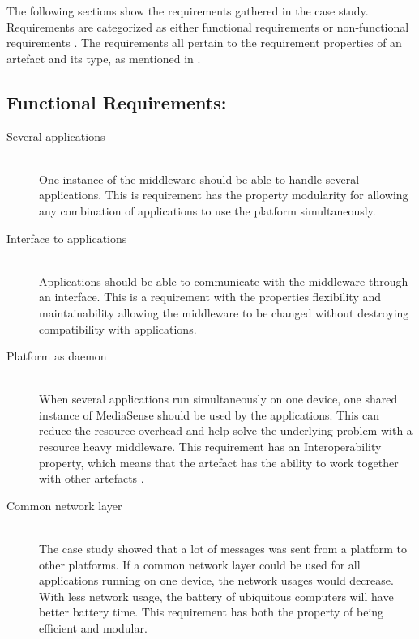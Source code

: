
The following sections show the requirements gathered in the case study. Requirements are categorized as either functional requirements or non-functional requirements \cite{Roman1985}. The requirements all pertain to the requirement properties of an artefact and its type, as mentioned in \cite{johannesson2012design}. 

\subsection{Functional Requirements:}
\begin{description}
	\item[Several applications] \hfill \\
	One instance of the middleware should be able to handle several applications.
	This is requirement has the property modularity for allowing any combination of applications to use the platform simultaneously.
		
	
	\item[Interface to applications] \hfill \\
	Applications should be able to communicate with the middleware through an interface.
	This is a requirement with the properties flexibility and maintainability allowing the middleware to be changed without destroying compatibility with applications.
	
	\item[Platform as daemon] \hfill \\
	When several applications run simultaneously on one device, one shared instance of MediaSense should be used by the applications. This can reduce the resource overhead and help solve the underlying problem with a resource heavy middleware. This requirement has an Interoperability property, which means that the artefact has the ability to work together with other artefacts \cite{johannesson2012design}. 
	
	\item[Common network layer] \hfill \\
	The case study showed that a lot of messages was sent from a platform to other platforms. If a common network layer could be used for all applications running on one device, the network usages would decrease. With less network usage, the battery of ubiquitous computers will have better battery time. This requirement has both the property of being efficient and modular. 
	

\end{description}
